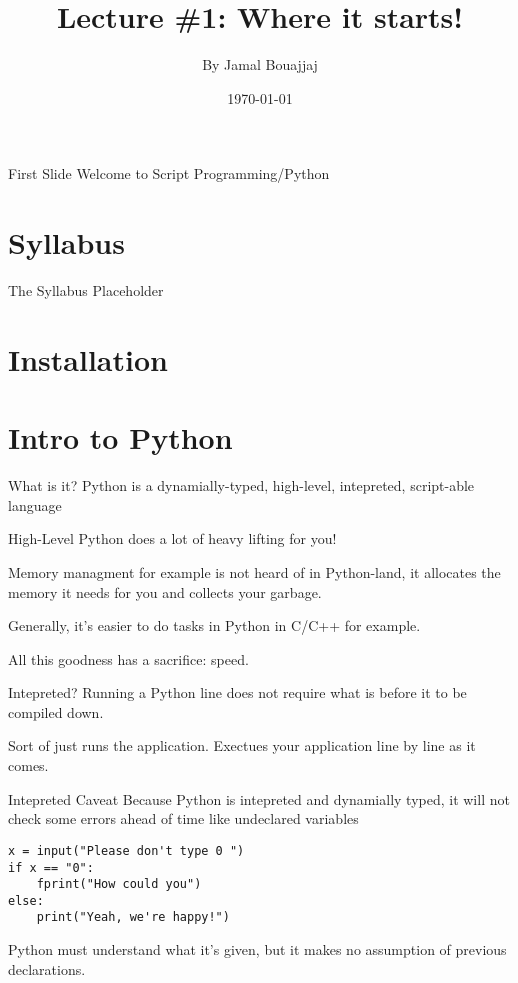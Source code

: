 \documentclass[10pt]{beamer}
\title{Lecture \#1: Where it starts!}
\author{By Jamal Bouajjaj}
\date{\today}
\institute{For University of New Haven's Fall 2023 CSCIxx51 Course}
\begin{document}
\maketitle

\begin{frame}[standout]{First Slide}
  Welcome to Script Programming/Python
\end{frame}

\section{Syllabus}

\begin{frame}{The Syllabus}
    Placeholder
\end{frame}

\section{Installation}

\section{Intro to Python}
\begin{frame}{What is it?}
    Python is a dynamially-typed, high-level, intepreted, script-able language
\end{frame}

\begin{frame}{High-Level}
    Python does a lot of heavy lifting for you!

    Memory managment for example is not heard of in Python-land, it allocates the memory it needs for you and collects your garbage.

    Generally, it's easier to do tasks in Python in C/C++ for example.

    All this goodness has a sacrifice: speed.
\end{frame}

\begin{frame}{Intepreted?}
    Running a Python line does not require what is before it to be compiled down.

    Sort of just runs the application. Exectues your application line by line as it comes.
\end{frame}

\begin{frame}[containsverbatim]{Intepreted Caveat}
    Because Python is intepreted and dynamially typed, it will not check some errors ahead of time like undeclared variables

    \begin{verbatim}
x = input("Please don't type 0 ")
if x == "0":
    fprint("How could you")
else:
    print("Yeah, we're happy!")
    \end{verbatim}

    Python must understand what it's given, but it makes no assumption of previous declarations.
\end{frame}
\end{document}
